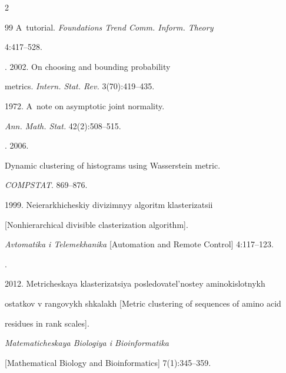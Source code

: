 \begin{multicols}{2}
{{\begin{thebibliography}{99}
A~tutorial. \textit{Foundations Trend Comm. Inform. Theory}

4:417--528.


.  2002. On choosing and bounding probability

metrics. \textit{Intern. Stat. Rev.} 3(70):419--435.


 1972. A~note on asymptotic joint normality.

\textit{Ann. Math. Stat.} 42(2):508--515.



\pagebreak




.  2006.

Dynamic clustering of histograms using Wasserstein metric.

\mbox{\textit{COMPSTAT}}. 869--876.



1999. Neierarkhicheskiy divizimnyy algoritm klasterizatsii

[Nonhierarchical divisible clasterization algorithm].

\textit{Avtomatika i Telemekhanika} [Automation and Remote Control] 4:117--123.




.

2012. Metricheskaya klasterizatsiya posledovatel'nostey aminokislotnykh

ostatkov v rangovykh shkalakh [Metric clustering of sequences of amino acid

residues in rank scales].

\textit{Matematicheskaya Biologiya i Bioinformatika}\linebreak\vspace*{-12pt}



\columnbreak



\noindent

[Mathematical Biology and Bioinformatics] 7(1):345--359.



\end{thebibliography}}}
\end{multicols}
